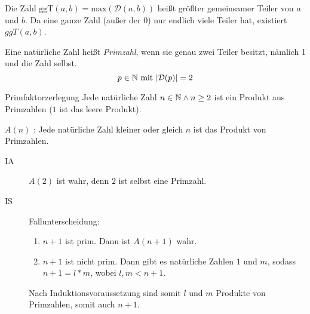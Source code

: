 Die Zahl $\mathrm{ggT}(a,b) = \mathrm{max}(\mathcal{D}(a,b))$ heißt größter gemeinsamer Teiler von $a$ und $b$. Da eine ganze Zahl (außer der $0$) nur endlich viele Teiler hat, existiert $ggT(a,b)$.


Eine natürliche Zahl heißt \emph{Primzahl}, wenn sie genau zwei Teiler besitzt, nämlich 1 und die Zahl selbst.
\begin{equation*}
  p\in\mathbb{N} \text{ mit } |\mathcal{D}(p)| = 2
\end{equation*}

\begin{satz}{Primfaktorzerlegung}
  Jede natürliche Zahl $n\in\mathbb{N} \wedge n\geq2$ ist ein Produkt aus Primzahlen ($1$ ist das leere Produkt).
\end{satz}

\beweis
$A(n)$ : \glqq Jede natürliche Zahl kleiner oder gleich $n$ ist das Produkt von Primzahlen.\grqq

\begin{description}
  \item[IA] $A(2)$ ist wahr, denn $2$ ist selbst eine Primzahl.
  \item[IS] Fallunterscheidung:
  \begin{enumerate}
    \item $n+1$ ist prim. Dann ist $A(n+1)$ wahr.
    \item $n+1$ ist nicht prim. Dann gibt es natürliche Zahlen $1$ und $m$, sodass $n+1=l* m$, wobei $l,m<n+1$.
  \end{enumerate}
  Nach Induktionsvoraussetzung sind somit $l$ und $m$ Produkte von Primzahlen, somit auch $n+1$.
\end{description}
